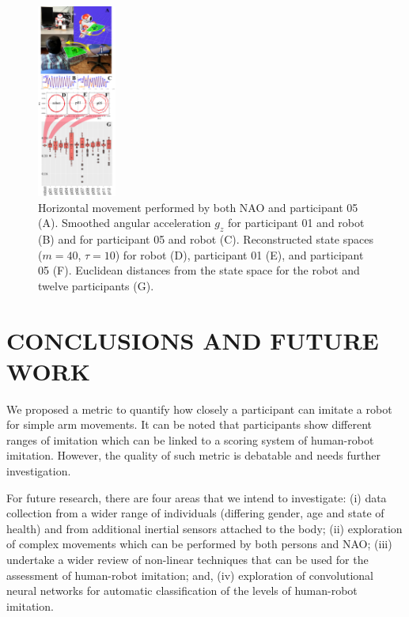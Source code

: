\documentclass{sig-alternate-05-2015}
\begin{document}
\begin{figure}[ht]
\centering
\includegraphics[width=0.23\textwidth]{fig06}
\caption{
Horizontal movement performed by both NAO and participant 05 (A).
Smoothed angular acceleration $g_z$ for participant 01  and robot (B)
and for participant 05 and robot (C).
Reconstructed state spaces  ($m=40$, $\tau=10$) for robot (D), participant 01 (E), and participant 05 (F).
Euclidean distances from the state space for the robot and twelve participants (G).
}
\label{fig:main}
\end{figure}



\section{CONCLUSIONS AND FUTURE WORK}
We proposed a metric to quantify how closely a participant can imitate a robot for simple arm
movements.
It can be noted
that participants show different ranges
of imitation which can be linked to a scoring system of human-robot imitation.
However, the quality of such metric is debatable and needs further investigation.

For future research, there are four areas that we intend to investigate:
(i) data collection from a wider range of individuals (differing gender, age and state of health)
and from additional inertial sensors attached to the body;
(ii) exploration of complex movements which can be performed by both persons and NAO;
(iii) undertake a wider review of non-linear techniques that can be used for
the assessment of human-robot imitation; and,
(iv) exploration of convolutional neural networks for automatic
classification of the levels of human-robot imitation.





\end{document}

